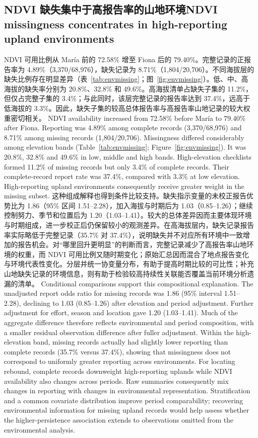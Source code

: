 \subsection{\ifzh NDVI 缺失集中于高报告率的山地环境\else NDVI missingness concentrates in high-reporting upland environments\fi}
\ifzh
NDVI 可用比例从 María 前的 72.58\% 增至 Fiona 后的 79.40\%。完整记录的正报告率为 4.89\%（3,370/68,976），缺失记录为 8.71\%（1,804/20,706）。不同海拔层的缺失比例存在明显差异（表~\ref{tab:envmissing}；图~\ref{fig:envmissing}）。低、中、高海拔的缺失率分别为 20.8\%、32.8\% 和 49.6\%。高海拔清单占缺失子集的 11.2\%，但仅占完整子集的 3.4\%；与此同时，该层完整记录的报告率达到 37.4\%，远高于低海拔的 3.3\%。因此，缺失子集的较高总体报告率与高报告率山地记录的较大权重密切相关。
\else
NDVI availability increased from 72.58\% before Mar\'ia to 79.40\% after Fiona. Reporting was 4.89\% among complete records (3,370/68,976) and 8.71\% among missing records (1,804/20,706). Missingness differed considerably among elevation bands (Table~\ref{tab:envmissing}; Figure~\ref{fig:envmissing}). It was 20.8\%, 32.8\% and 49.6\% in low, middle and high bands. High-elevation checklists formed 11.2\% of missing records but only 3.4\% of complete records. Their complete-record report rate was 37.4\%, compared with 3.3\% at low elevation. High-reporting upland environments consequently receive greater weight in the missing subset.
\fi
{}
\ifzh
这种组成解释也得到条件比较支持。缺失指示变量的未校正报告优势比为 1.86（95\% 区间 1.51--2.28），加入海拔与时期后为 1.03（0.85--1.26）；继续控制努力、季节和位置后为 1.20（1.03--1.41）。较大的总体差异因而主要体现环境与时期组成，进一步校正后仍保留较小的观测差异。在高海拔层内，缺失记录报告率实际略低于完整记录（35.7\% 对 37.4\%），说明缺失并不对应所有环境中一致增加的报告机会。对“哪里回升更明显”的判断而言，完整记录减少了高报告率山地环境的权重，而 NDVI 可用比例又随时期变化；原始汇总因而混合了地点报告变化与环境代表性变化。分层并统一协变量分布，有助于提高时期比较的可比性；补充山地缺失记录的环境信息，则有助于检验较高持续性关联能否覆盖当前环境分析遗漏的清单。
\else
Conditional comparisons support this compositional explanation. The unadjusted report odds ratio for missing records was 1.86 (95\% interval 1.51--2.28), declining to 1.03 (0.85--1.26) after elevation and period adjustment. Further adjustment for effort, season and location gave 1.20 (1.03--1.41). Much of the aggregate difference therefore reflects environmental and period composition, with a smaller residual observation difference after fuller adjustment. Within the high-elevation band, missing records actually had slightly lower reporting than complete records (35.7\% versus 37.4\%), showing that missingness does not correspond to uniformly greater reporting across environments. For locating rebound, complete records downweight high-reporting uplands while NDVI availability also changes across periods. Raw summaries consequently mix changes in reporting with changes in environmental representation. Stratification and a common covariate distribution improve period comparability; recovering environmental information for missing upland records would help assess whether the higher-persistence association extends to observations omitted from the environmental analysis.

